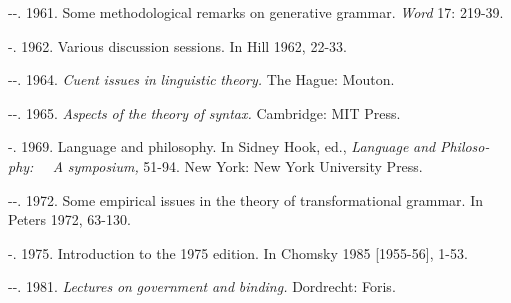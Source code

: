\begin{listWWNumxleveli}
\item 
\begin{styleStandard}
{}-{}-. 1961. Some methodological remarks on generative grammar. \textit{Word}\textit{ }17: 219-39.
\end{styleStandard}


\item 
\begin{styleStandard}
{}-. 1962. Various discussion sessions. In Hill 1962, 22-33.
\end{styleStandard}


\item 
\begin{styleStandard}
{}-{}-. 1964. \textit{Cu}\textit{{\textquotedbl}}\textit{ent}\textit{ }\textit{issues}\textit{ }\textit{in}\textit{ }\textit{linguistic}\textit{ }\textit{theory.}\textit{ }The Hague: Mouton.
\end{styleStandard}


\item 
\begin{styleStandard}
{}-{}-. 1965. \textit{Aspects}\textit{ }\textit{of}\textit{ }\textit{the}\textit{ }\textit{theory}\textit{ }\textit{of}\textit{ }\textit{syntax.}\textit{ }Cambridge: MIT Press.
\end{styleStandard}


\item 
\begin{styleStandard}
{}-. 1969. Language and philosophy. In Sidney Hook, ed., \textit{Language}\textit{ }\textit{and}\textit{ }\textit{Philoso-}\textit{ }\textit{phy: \ }\textit{\ }\textit{A}\textit{ }\textit{symposium,}\textit{ }51-94. New York: New York University Press.
\end{styleStandard}


\item 
\begin{styleStandard}
{}-{}-. 1972. Some empirical issues in the theory of transformational grammar. In Peters 1972, 63-130.
\end{styleStandard}


\item 
\begin{styleStandard}
{}-. 1975. Introduction to the 1975 edition. In Chomsky 1985 [1955-56], 1-53.
\end{styleStandard}


\item 
\begin{styleStandard}
{}-{}-. 1981. \textit{Lectures}\textit{ }\textit{on}\textit{ }\textit{government}\textit{ }\textit{and}\textit{ }\textit{binding.}\textit{ }Dordrecht: Foris.
\end{styleStandard}



\end{listWWNumxleveli}
